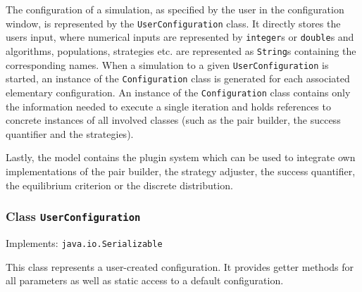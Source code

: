 \documentclass[parskip=full,11pt]{scrartcl}
\begin{document}
The configuration of a simulation, as specified by the user in the configuration window, is represented by the \texttt{UserConfiguration} class. It directly stores the users input, where numerical inputs are represented by \texttt{integer}s or \texttt{double}s and algorithms, populations, strategies etc. are represented as \texttt{String}s containing the corresponding names. When a simulation to a given \texttt{UserConfiguration} is started, an instance of the \texttt{Configuration} class is generated for each associated elementary configuration. An instance of the \texttt{Configuration} class contains only the information needed to execute a single iteration and holds references to concrete instances of all involved classes (such as the pair builder, the success quantifier and the strategies).

Lastly, the model contains the plugin system which can be used to integrate own implementations of the pair builder, the strategy adjuster, the success quantifier, the equilibrium criterion or the discrete distribution.

\subsubsection{Class \texttt{UserConfiguration}}
Implements: \texttt{java.io.Serializable}

This class represents a user-created configuration. It provides getter methods for all parameters as well as static access to a default configuration.
\end{document}
